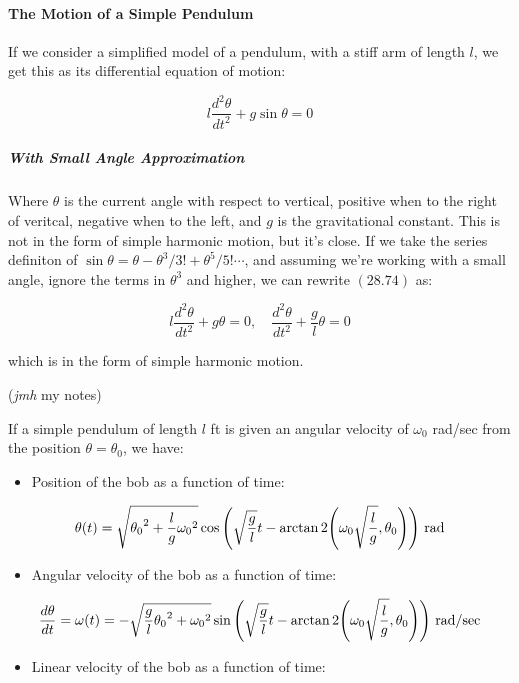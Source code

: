 \documentclass{article}
\begin{document}
\paragraph{The Motion of a Simple Pendulum}

If we consider a simplified model of a pendulum, with a stiff arm of length $l$, we get this as its differential equation of motion:

\[ \tag{28.74} l \frac{d^2 \theta}{dt^2} + g \sin{\theta} = 0 \]

\subparagraph{With Small Angle Approximation}

Where $\theta$ is the current angle with respect to vertical, positive when to the right of veritcal, negative when to the left, and $g$ is the gravitational constant. This is not in the form of simple harmonic motion, but it's close. If we take the series definiton of $\sin{\theta} = \theta - \theta^3 / 3! + \theta^5 / 5! \cdots$, and assuming we're working with a small angle, ignore the terms in $\theta^3$ and higher, we can rewrite $(28.74)$ as:

\[ \tag{28.76} l \frac{d^2 \theta}{dt^2} + g\theta = 0, \quad \frac{d^2 \theta}{dt^2} + \frac{g}{l}\theta = 0 \]

which is in the form of simple harmonic motion.

(\emph{jmh} my notes)

If a simple pendulum of length $l$ ft is given an angular velocity of $\omega_0$ rad/sec from the position $\theta = \theta_0$, we have:

\begin{itemize}
\item Position of the bob as a function of time:
\end{itemize}

\[ \theta{(t)} = \sqrt{ {\theta_0}^2 + \frac{l}{g}{ \omega_0}^2} \cos{\left(\sqrt{ \frac{g}{l}}t - \arctan2{\left(\omega_0 \sqrt{\frac{l}{g}}, { \theta_0}\right)}\right)} ~ \text{rad} \]

\begin{itemize}
\item Angular velocity of the bob as a function of time:
\end{itemize}

\[ \frac{d\theta}{dt} = \omega{(t)} = - \sqrt{ \frac{g}{l} {\theta_0}^2 + { \omega_0}^2} \sin{\left(\sqrt{ \frac{g}{l}}t - \arctan2{\left(\omega_0 \sqrt{\frac{l}{g}}, { \theta_0}\right)}\right)} ~ \text{rad/sec} \]

\begin{itemize}
\item Linear velocity of the bob as a function of time:
\end{itemize}
\end{document}
